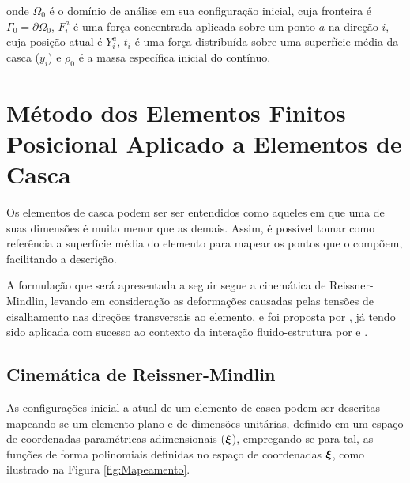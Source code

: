 \noindent onde $\Omega_0$ é o domínio de análise em sua configuração inicial, cuja fronteira é $\Gamma_0=\partial\Omega_0$, $F_i^a$ é uma força concentrada aplicada sobre um ponto $a$ na direção $i$, cuja posição atual é $Y_i^a$, $t_i$ é uma força distribuída sobre uma superfície média da casca ($y_i$) e $\rho_0$ é a massa específica inicial do contínuo.


\section{Método dos Elementos Finitos Posicional Aplicado a Elementos de Casca} \label{MEFP}

Os elementos de casca podem ser ser entendidos como aqueles em que uma de suas dimensões é muito menor que as demais. Assim, é possível tomar como referência a superfície média do elemento para mapear os pontos que o compõem, facilitando a descrição. 

A formulação que será apresentada a seguir segue a cinemática de Reissner-Mindlin, levando em consideração as deformações causadas pelas tensões de cisalhamento nas direções transversais ao elemento, e foi proposta por , já tendo sido aplicada com sucesso ao contexto da interação fluido-estrutura por  e .

\subsection{Cinemática de Reissner-Mindlin}

As configurações inicial a atual de um elemento de casca podem ser descritas mapeando-se um elemento plano e de dimensões unitárias, definido em um espaço de coordenadas paramétricas adimensionais ($\boldsymbol{\xi}$), empregando-se para tal, as funções de forma polinomiais definidas no espaço de coordenadas $\boldsymbol{\xi}$, como ilustrado na Figura \ref{fig:Mapeamento}.

